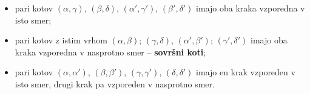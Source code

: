 \begin{frame}
\begin{block}{}
\begin{figure}[H]
                \end{figure}

                \begin{itemize}
                    \item pari kotov $(\alpha, \gamma)$, $(\beta, \delta)$, $(\alpha', \gamma')$, $(\beta', \delta')$ imajo oba kraka vzporedna v isto smer;
                    \item pari kotov z istim vrhom $(\alpha, \beta)$; $(\gamma, \delta)$, $(\alpha', \beta')$; $(\gamma', \delta')$ imajo oba kraka vzporedna v nasprotno smer -- \textbf{sovršni koti};
                    \item pari kotov $(\alpha, \alpha')$, $(\beta, \beta')$, $(\gamma,\gamma')$, $(\delta,\delta')$ imajo en krak vzporeden v isto smer, drugi krak pa vzporeden v nasprotno smer.
                \end{itemize}
            \end{block}
        \end{frame}


